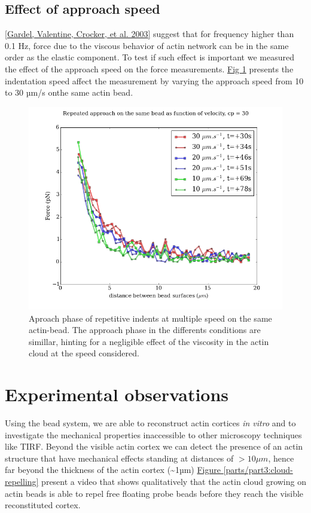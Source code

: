 \documentclass[A4paperpaper,11pt,english]{sphinxmanual}
\begin{document}
\subsection{Effect of approach speed}
\label{parts/part3:effect-of-approach-speed}
{\hyperref[parts/part3:gardel2003]{{[}Gardel, Valentine, Crocker,  et al.  2003{]}}} suggest that for frequency higher than 0.1 Hz, force due to
the viscous behavior  of actin network can be in the same order as the elastic
component. To test if such effect is important we measured the effect of the
approach speed on the force measurements. \hyperref[parts/part3:many-speed]{Fig  \ref*{parts/part3:many-speed}} presents the
indentation speed affect the measurement by varying the approach speed from 10
to 30 µm/s onthe same actin bead.
\begin{figure}[htbp]
\centering
\capstart

\includegraphics[width=0.800\linewidth]{many_speed.png}
\caption{Aproach phase of repetitive indents at multiple speed on the same actin-bead. The approach phase in the differents conditions are simillar, hinting for a negligible effect of the viscosity  in the actin cloud at the speed considered.}\label{parts/part3:many-speed}\end{figure}


\section{Experimental observations}
\label{parts/part3:experimental-observations}
Using the bead system, we are able to reconstruct actin cortices \emph{in vitro} and
to investigate the mechanical properties inaccessible to other microscopy
techniques like TIRF. Beyond the visible actin cortex we can detect the
presence of an actin structure that have mechanical effects  standing at
distances of \(> 10\mu{}m\), hence far beyond the thickness of the actin cortex (\textasciitilde{}1µm)
\hyperref[parts/part3:cloud-repelling]{Figure  \ref*{parts/part3:cloud-repelling}} present a video that shows qualitatively that the actin cloud growing
on actin beads is able to repel free floating probe beads before they reach the
visible reconstituted cortex.
\end{document}
